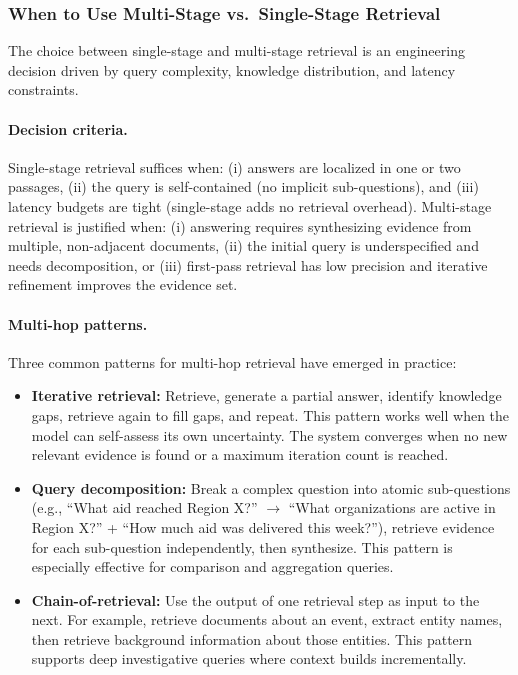\subsubsection{When to Use Multi-Stage vs.\ Single-Stage Retrieval}
The choice between single-stage and multi-stage retrieval is an engineering decision driven by query complexity, knowledge distribution, and latency constraints.

\paragraph{Decision criteria.}
Single-stage retrieval suffices when: (i) answers are localized in one or two passages, (ii) the query is self-contained (no implicit sub-questions), and (iii) latency budgets are tight (single-stage adds no retrieval overhead). Multi-stage retrieval is justified when: (i) answering requires synthesizing evidence from multiple, non-adjacent documents, (ii) the initial query is underspecified and needs decomposition, or (iii) first-pass retrieval has low precision and iterative refinement improves the evidence set.

\paragraph{Multi-hop patterns.}
Three common patterns for multi-hop retrieval have emerged in practice:
\begin{itemize}[leftmargin=1.5em, itemsep=2pt]
  \item \textbf{Iterative retrieval:} Retrieve, generate a partial answer, identify knowledge gaps, retrieve again to fill gaps, and repeat. This pattern works well when the model can self-assess its own uncertainty. The system converges when no new relevant evidence is found or a maximum iteration count is reached.
  \item \textbf{Query decomposition:} Break a complex question into atomic sub-questions (e.g., ``What aid reached Region X?'' $\rightarrow$ ``What organizations are active in Region X?'' + ``How much aid was delivered this week?''), retrieve evidence for each sub-question independently, then synthesize. This pattern is especially effective for comparison and aggregation queries.
  \item \textbf{Chain-of-retrieval:} Use the output of one retrieval step as input to the next. For example, retrieve documents about an event, extract entity names, then retrieve background information about those entities. This pattern supports deep investigative queries where context builds incrementally.
\end{itemize}

